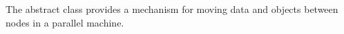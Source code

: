 

The  abstract class provides
a mechanism for moving data and objects between
nodes in a parallel machine.
